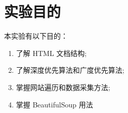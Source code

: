 \section{实验目的}
本实验有以下目的：
\begin{enumerate}
    \item 了解 HTML 文档结构;
    \item 了解深度优先算法和广度优先算法;
    \item 掌握网站遍历和数据采集方法;
    \item 掌握 BeautifulSoup 用法
\end{enumerate}
